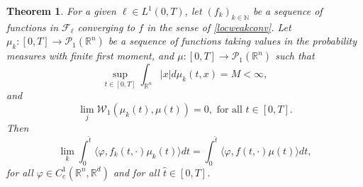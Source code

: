 \documentclass[11pt]{article}
\theoremstyle{plain}
\newtheorem{theorem}{Theorem}[section]
\theoremstyle{definition}
\theoremstyle{remark}
\numberwithin{equation}{section}
\begin{document}
\begin{theorem}\label{thm:3}
For a given $\ell \in L^1(0,T)$, let $(f_k)_{k \in \mathbb N}$ be a sequence of functions in $\mathcal F_\ell$ converging to $f$ in the sense of \eqref{locweakconv}. Let $\mu_k:[0,T] \to \mathcal P_1(\mathbb R^{n})$ be a sequence of functions taking values
in the probability measures with finite first moment, and $\mu :[0,T] \to \mathcal P_1(\mathbb R^n)$ such that
\begin{equation}\label{unifmom}
\sup_{t \in [0,T]} \int_{\mathbb R^n} |x| d\mu_k(t,x) = M < \infty,
\end{equation}
and
\begin{equation}\label{convwass}
\lim_j \mathcal W_1(\mu_k(t),\mu(t)) = 0, \mbox{ for all } t \in [0,T].
\end{equation}
Then
\begin{equation}\label{compmu}
\lim_k \int_0^{\hat t} \langle \varphi, f_k(t,\cdot) \mu_k(t) \rangle dt = \int_0^{\hat t} \langle \varphi, f(t,\cdot) \mu(t) \rangle dt,
\end{equation}
for all $\varphi \in C_c^1(\mathbb R^n, \mathbb R^d)$ and for all $\hat t \in [0,T]$.
\end{theorem}
\end{document}
